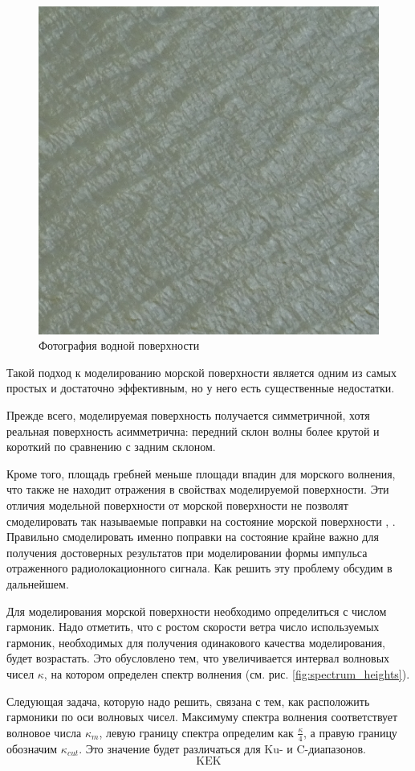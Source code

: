 \begin{figure}[h!]
    \centering
    \includegraphics[width=0.49\linewidth]{img/water_photo.png}
    \caption{Фотография водной поверхности}
    \label{fig:}
\end{figure}

Такой подход к моделированию морской поверхности является одним из самых простых и достаточно эффективным, но у него есть существенные недостатки.

Прежде всего, моделируемая поверхность получается симметричной, хотя реальная поверхность асимметрична: передний склон волны более крутой и короткий по сравнению с задним склоном.

Кроме того, площадь гребней меньше площади впадин для морского волнения, что
также не находит отражения в свойствах моделируемой поверхности. Эти отличия
модельной поверхности от морской поверхности не позволят смоделировать так
называемые поправки на состояние морской поверхности \cite{fu},
\cite{pustovoytenko}. 
Правильно смоделировать именно поправки на состояние крайне важно для получения
достоверных результатов при моделировании формы импульса
отраженного радиолокационного
сигнала. Как решить эту проблему обсудим в дальнейшем.


Для моделирования морской поверхности необходимо определиться с числом
гармоник. Надо отметить, что с ростом скорости ветра число используемых
гармоник, необходимых для получения одинакового качества моделирования, будет
возрастать. Это обусловлено тем, что увеличивается интервал волновых чисел
$\kappa$, на котором определен спектр волнения (см. рис.
\ref{fig:spectrum_heights}). 

Следующая задача, которую надо решить, связана с тем, как расположить гармоники
по оси волновых чисел. Максимуму спектра волнения соответствует волновое числа
$\kappa_m$, левую границу спектра определим как $\frac{\kappa}{4}$, а правую
границу обозначим $\kappa_{cut}$. Это значение будет различаться для Ku- и
C-диапазонов.
\begin{equation}
    \label{eq:k_edge}
    \text{KEK}
\end{equation}


